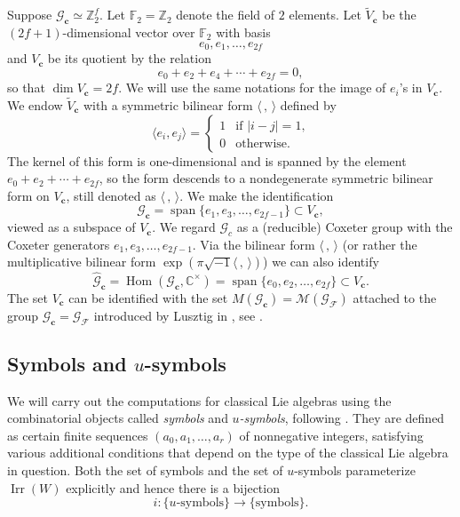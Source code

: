 \documentclass{amsart}
\theoremstyle{definition}
\DeclareMathOperator{\Hom}{Hom}
\DeclareMathOperator{\Irr}{Irr}
\DeclareMathOperator{\spn}{span}
\newcommand{\C}{\mathbb{C}}
\newcommand{\F}{\mathbb{F}}
\newcommand{\Z}{\mathbb{Z}}
\newcommand{\cF}{\mathcal{F}}
\newcommand{\cG}{\mathcal{G}}
\newcommand{\cM}{\mathcal{M}}
\newcommand{\bc}{{\mathbf{c}}}
\newcommand{\0}{\mathcal{O}}
\begin{document}
Suppose $\cG_\bc \simeq \Z_2^f$.  Let $\F_2 = \Z_2$ denote the field of $2$ elements. Let $\tilde V_\bc$ be the $(2f+1)$-dimensional vector over $\F_2$ with basis
\[ e_0, e_1, \ldots, e_{2f} \]
and $V_\bc$ be its quotient by the relation
\begin{equation}\label{eqn:Vrel}
	e_0 + e_2 + e_4 + \cdots + e_{2f} = 0,
\end{equation}
so that $\dim V_\bc = 2f$. We will use the same notations for the image of $e_i$'s in $V_\bc$.
We endow $\tilde V_\bc$ with a symmetric bilinear form $\langle \,, \,\rangle$ defined by
\begin{equation}\label{eq:bilinear_form}
\langle e_i, e_j\rangle =
\begin{cases}
	1 & \text{if $|i - j| = 1$,} \\
	0 & \text{otherwise.}
\end{cases}
\end{equation}
The kernel of this form is one-dimensional and is spanned by the element $e_0 + e_2 + \cdots + e_{2f}$, so the form descends to a nondegenerate symmetric bilinear form on $V_\bc$, still denoted as $\langle \, , \,\rangle$.  We make
the identification
\[
	\cG_\bc = \spn \{e_1, e_3, \ldots, e_{2f-1}\}  \subset V_\bc,
\]
viewed as a subspace of $V_\bc$. We regard $\cG_c$ as a (reducible) Coxeter group with the Coxeter generators $e_1, e_3, \ldots, e_{2f-1}$. Via the bilinear form $\langle \, , \,\rangle$ (or rather the multiplicative bilinear form $\exp(\pi \sqrt{-1} \langle \, , \,\rangle)$) we can also identify
\[
	\hat{\cG}_\bc = \Hom(\cG_\bc, \C^\times) =\spn \{e_0, e_2, \ldots, e_{2f}\} \subset V_\bc.
\]
The set $V_\bc$ can be identified with the set $M(\cG_\bc)=\cM(\cG_\cF)$ attached to the group $\cG_\bc=\cG_\cF$ introduced by Lusztig in \cite{Lusztig1984}, see \cite[\S\,3.1]{Achar-Sage-special}.


\subsection{Symbols and $u$-symbols} \label{subsec:symbol}


We will carry out the computations for classical Lie algebras using the combinatorial objects called \emph{symbols} and
\emph{$u$-symbols}, following \cite{Achar-Sage-special}.  They are  defined as certain finite sequences
$(a_0,a_1, \ldots, a_r)$ of nonnegative integers, satisfying various
additional conditions that depend on the type of the classical Lie algebra in question.  Both the set of symbols and the set of $u$-symbols
parameterize $\Irr(W)$ explicitly and hence there is a
bijection
\[
i: \{\text{$u$-symbols}\} \to \{\text{symbols}\}.
\]
\end{document}
